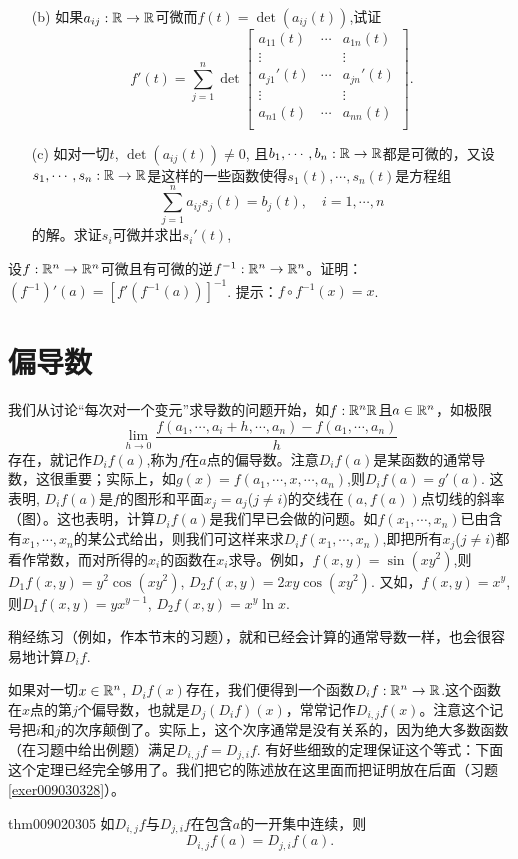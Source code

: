\begin{problemset}
\begin{enumerate}
\item[(b)] 如果$a_{ij}: \mathbb{R} \to \mathbb{R}$可微而$f(t) = \det(a_{ij}(t))$,试证
\[
f'(t) = \sum_{j=1}^{n}{\det\begin{bmatrix}
a_{11}(t) &\cdots & a_{1n}(t) \\
\vdots & & \vdots\\
a_{j1}'(t) & \cdots & a_{jn}'(t)\\
\vdots & & \vdots\\
a_{n1}(t) &\cdots & a_{nn}(t) \\
\end{bmatrix}}.
\]

\item[(c)] 如对一切$t$, $\det{(a_{ij}(t))} \neq 0$, 且$b_1, \cdots, b_n: \mathbb{R} \to \mathbb{R}$都是可微的，又设$s_1,\cdots, s_n:\mathbb{R} \to \mathbb{R}$是这样的一些函数使得$s_1(t),\cdots, s_n(t)$是方程组
\[
\sum_{j=1}^{n}{a_{ij}s_j(t) = b_j(t)}, \quad i=1,\cdots, n
\]
的解。求证$s_i$可微并求出$s_i'(t)$,
\end{enumerate}

\item 设$f:\mathbb{R}^n \to \mathbb{R}^n$可微且有可微的逆$f^{-1}:\mathbb{R}^n \to \mathbb{R}^n$。证明：$(f^{-1})'(a) = [f'(f^{-1}(a))]^{-1}$. 提示：$f \circ f^{-1}(x) = x$.

\end{problemset}

\section{偏导数}\label{section0090203}
我们从讨论“每次对一个变元”求导数的问题开始，如$f: \mathbb{R}^n \mathbb{R}$且$a \in \mathbb{R}^n$，如极限
\[
\lim_{h \to 0}{\frac{f(a_1, \cdots, a_i + h, \cdots, a_n) - f(a_1,\cdots, a_n)}{h}}
\]
存在，就记作$D_if(a)$,称为$f$在$a$点的偏导数。注意$D_if(a)$是某函数的通常导数，这很重要；实际上，如$g(x) = f(a_1,\cdots, x,\cdots, a_n)$,则$D_if(a) = g'(a)$. 这表明, $D_if(a)$是$f$的图形和平面$x_j = a_j$($j \neq i$)的交线在$(a, f(a))$点切线的斜率（图）。这也表明，计算$D_if(a)$是我们早已会做的问题。如$f(x_1,\cdots,x_n)$已由含有$x_1,\cdots,x_n$的某公式给出，则我们可这样来求$D_if(x_1,\cdots, x_n)$,即把所有$x_j$($j \neq i$)都看作常数，而对所得的$x_i$的函数在$x_i$求导。例如，$f(x,y) = \sin(xy^2)$,则$D_1f(x,y) = y^2\cos(xy^2)$, $D_2f(x, y) = 2xy\cos(xy^2)$. 又如，$f(x,y) = x^y$, 则$D_1f(x, y) = yx^{y-1}$, $D_2f(x, y) = x^y\ln{x}$.

稍经练习（例如，作本节末的习题），就和已经会计算的通常导数一样，也会很容易地计算$D_if$.

如果对一切$x \in \mathbb{R}^n$, $D_if(x)$存在，我们便得到一个函数$D_if: \mathbb{R}^n \to \mathbb{R}$.这个函数在$x$点的第$j$个偏导数，也就是$D_j(D_if)(x)$，常常记作$D_{i,j}f(x)$。注意这个记号把$i$和$j$的次序颠倒了。实际上，这个次序通常是没有关系的，因为绝大多数函数（在习题中给出例题）满足$D_{i,j}f = D_{j,i}f$. 有好些细致的定理保证这个等式：下面这个定理已经完全够用了。我们把它的陈述放在这里面而把证明放在后面（习题\ref{exer009030328}）。
\begin{theorem}{}{thm009020305}
如$D_{i,j}f$与$D_{j,i}f$在包含$a$的一开集中连续，则
\[
D_{i,j}f(a) = D_{j,i}f(a).
\]
\end{theorem}

